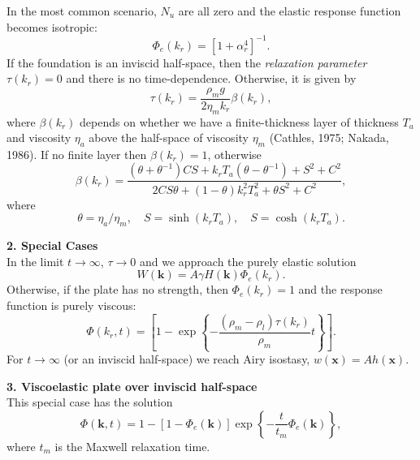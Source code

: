 \documentclass[12pt]{article}
\begin{document}
In the most common scenario, $N_u$ are all zero and the elastic response function becomes isotropic:
\begin{equation}
\Phi_e(k_r) = \left [ 1 + \alpha_r^4 \right ]^{-1}.
\label{eq:Eq_9}
\end{equation}
If the foundation is an inviscid half-space, then the {\it relaxation parameter} $\tau(k_r) = 0$ and there is no time-dependence.
Otherwise, it is given by
\begin{equation}
\tau(k_r) = \frac{\rho_m g}{2 \eta_m k_r} \beta(k_r),
\label{eq:Eq_10}
\end{equation}
where $\beta(k_r)$ depends on whether we have a finite-thickness layer of thickness $T_a$ and viscosity
$\eta_a$ above the half-space of viscosity $\eta_m$ (Cathles, 1975; Nakada, 1986).
If no finite layer then $\beta(k_r) = 1$, otherwise
\begin{equation}
\beta(k_r) = \frac{(\theta + \theta^{-1}) CS + k_r T_a (\theta - \theta^{-1}) + S^2 + C^2}{2CS\theta + (1-\theta)k_r^2 T_a^2 + \theta S^2 + C^2},
\label{eq:Eq_11}
\end{equation}
where
\begin{equation}
\theta = \eta_a/\eta_m, \quad S = \sinh (k_r T_a), \quad S = \cosh (k_r T_a).
\label{eq:Eq_12}
\end{equation}

{\center \bf 2. Special Cases}\\

\noindent
In the limit $t \rightarrow \infty$, $\tau  \rightarrow0$ and we approach the purely elastic solution
\begin{equation}
W(\mathbf{k}) = A \gamma H(\mathbf{k}) \Phi_e(k_r).
\label{eq:Eq21}
\end{equation}
Otherwise, if the plate has no strength, then $\Phi_e(k_r) = 1$ and the response function is {purely viscous}:
\begin{equation}
\Phi(k_r,t) = \left [ 1 - \exp \left \{ - \frac{(\rho_m - \rho_l) \tau(k_r)}{\rho_m} t \right \} \right ].
\label{eq:Eq19b}
\end{equation}
For $t \rightarrow \infty$ (or an inviscid half-space) we reach Airy isostasy, $w(\mathbf{x}) = A h(\mathbf{x})$.

{\center \bf 3. Viscoelastic plate over inviscid half-space}\\

This special case has the solution
\begin{equation}
\Phi(\mathbf{k},t) = 1 - \left [ 1 - \Phi_e(\mathbf{k}) \right ] \exp \left \{ - \frac{t }{t_m}\Phi_e(\mathbf{k}) \right \},
\end{equation}
where $t_m$ is the Maxwell relaxation time.
\end{document}
